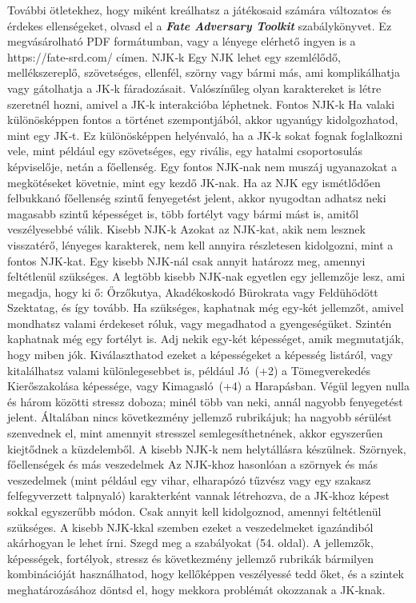 \documentclass[oneside]{book}
\newcommand{\fate}[1]{\textbf{\textit{#1}}}
\begin{document}
További ötletekhez, hogy miként kreálhatsz a játékosaid számára változatos és érdekes ellenségeket, olvasd el a \fate{Fate Adversary Toolkit} szabálykönyvet. Ez megvásárolható PDF formátumban, vagy a lényege elérhető ingyen is a https://fate-srd.com/ címen.
NJK‑k
Egy NJK lehet egy szemlélődő, mellékszereplő, szövetséges, ellenfél, szörny vagy bármi más, ami komplikálhatja vagy gátolhatja a JK‑k fáradozásait. Valószínűleg olyan karaktereket is létre szeretnél hozni, amivel a JK‑k interakcióba léphetnek.
Fontos NJK‑k
Ha valaki különösképpen fontos a történet szempontjából, akkor ugyanúgy kidolgozhatod, mint egy JK‑t. Ez különösképpen helyénvaló, ha a JK‑k sokat fognak foglalkozni vele, mint például egy szövetséges, egy rivális, egy hatalmi csoportosulás képviselője, netán a főellenség.
Egy fontos NJK‑nak nem muszáj ugyanazokat a megkötéseket követnie, mint egy kezdő JK‑nak. Ha az NJK egy ismétlődően felbukkanó főellenség szintű fenyegetést jelent, akkor nyugodtan adhatsz neki magasabb szintű képességet is, több fortélyt vagy bármi mást is, amitől veszélyesebbé válik.
Kisebb NJK‑k
Azokat az NJK‑kat, akik nem lesznek visszatérő, lényeges karakterek, nem kell annyira részletesen kidolgozni, mint a fontos NJK‑kat. Egy kisebb NJK‑nál csak annyit határozz meg, amennyi feltétlenül szükséges.
A legtöbb kisebb NJK‑nak egyetlen egy jellemzője lesz, ami megadja, hogy ki ő: Őrzőkutya, Akadékoskodó Bürokrata vagy Feldühödött Szektatag, és így tovább.
Ha szükséges, kaphatnak még egy‑két jellemzőt, amivel mondhatsz valami érdekeset róluk, vagy megadhatod a gyengeségüket. Szintén kaphatnak még egy fortélyt is.
Adj nekik egy‑két képességet, amik megmutatják, hogy miben jók. Kiválaszthatod ezeket a képességeket a képesség listáról, vagy kitalálhatsz valami különlegesebbet is, például Jó~(+2) a Tömegverekedés Kierőszakolása képessége, vagy Kimagasló~(+4) a Harapásban.
Végül legyen nulla és három közötti stressz doboza; minél több van neki, annál nagyobb fenyegetést jelent. Általában nincs következmény jellemző rubrikájuk; ha nagyobb sérülést szenvednek el, mint amennyit stresszel semlegesíthetnének, akkor egyszerűen kiejtődnek a küzdelemből. A kisebb NJK‑k nem helytállásra készülnek.
Szörnyek, főellenségek és más veszedelmek
Az NJK‑khoz hasonlóan a szörnyek és más veszedelmek (mint például egy vihar, elharapózó tűzvész vagy egy szakasz felfegyverzett talpnyaló) karakterként vannak létrehozva, de a JK‑khoz képest sokkal egyszerűbb módon. Csak annyit kell kidolgoznod, amennyi feltétlenül szükséges. A kisebb NJK‑kkal szemben ezeket a veszedelmeket igazándiból akárhogyan le lehet írni. Szegd meg a szabályokat (54. oldal). A jellemzők, képességek, fortélyok, stressz és következmény jellemző rubrikák bármilyen kombinációját használhatod, hogy kellőképpen veszélyessé tedd őket, és a szintek meghatározásához döntsd el, hogy mekkora problémát okozzanak a JK‑knak.
\end{document}
